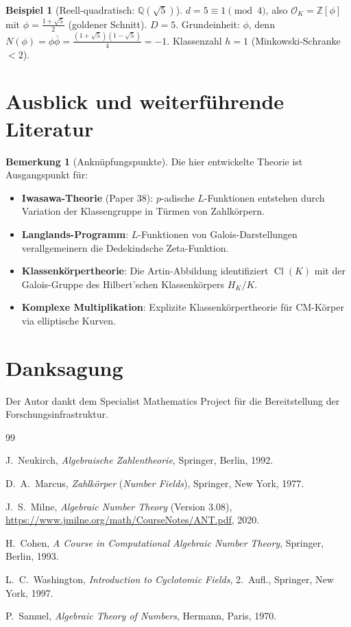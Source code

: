 \documentclass[12pt,a4paper]{amsart}
\theoremstyle{definition}
\newtheorem{example}[theorem]{Beispiel}
\newtheorem{remark}[theorem]{Bemerkung}
\newcommand{\Z}{\mathbb{Z}}
\newcommand{\Q}{\mathbb{Q}}
\newcommand{\OK}{\mathcal{O}_K}
\DeclareMathOperator{\Cl}{Cl}
\begin{document}
\begin{example}[Reell-quadratisch: $\Q(\sqrt{5})$]
$d = 5 \equiv 1 \pmod{4}$, also $\OK = \Z[\phi]$ mit $\phi = \tfrac{1+\sqrt{5}}{2}$
(goldener Schnitt).  $D = 5$.
Grundeinheit: $\phi$, denn $N(\phi) = \phi\bar\phi = \tfrac{(1+\sqrt{5})(1-\sqrt{5})}{4}
= -1$.  Klassenzahl $h = 1$ (Minkowski-Schranke $< 2$).
\end{example}

\section{Ausblick und weiterführende Literatur}

\begin{remark}[Anknüpfungspunkte]
Die hier entwickelte Theorie ist Ausgangspunkt für:
\begin{itemize}
  \item \textbf{Iwasawa-Theorie} (Paper 38): $p$-adische $L$-Funktionen
    entstehen durch Variation der Klassengruppe in Türmen von Zahlkörpern.
  \item \textbf{Langlands-Programm}: $L$-Funktionen von Galois-Darstellungen
    verallgemeinern die Dedekindsche Zeta-Funktion.
  \item \textbf{Klassenkörpertheorie}: Die Artin-Abbildung identifiziert
    $\Cl(K)$ mit der Galois-Gruppe des Hilbert'schen Klassenkörpers $H_K/K$.
  \item \textbf{Komplexe Multiplikation}: Explizite Klassenkörpertheorie
    für CM-Körper via elliptische Kurven.
\end{itemize}
\end{remark}

\section*{Danksagung}
Der Autor dankt dem Specialist Mathematics Project für die Bereitstellung
der Forschungsinfrastruktur.

\begin{thebibliography}{99}

J.~Neukirch,
\textit{Algebraische Zahlentheorie},
Springer, Berlin, 1992.

D.~A.~Marcus,
\textit{Zahlkörper} (\textit{Number Fields}),
Springer, New York, 1977.

J.~S.~Milne,
\textit{Algebraic Number Theory} (Version 3.08),
\url{https://www.jmilne.org/math/CourseNotes/ANT.pdf}, 2020.

H.~Cohen,
\textit{A Course in Computational Algebraic Number Theory},
Springer, Berlin, 1993.

L.~C.~Washington,
\textit{Introduction to Cyclotomic Fields},
2.\ Aufl., Springer, New York, 1997.

P.~Samuel,
\textit{Algebraic Theory of Numbers},
Hermann, Paris, 1970.

\end{thebibliography}
\end{document}
